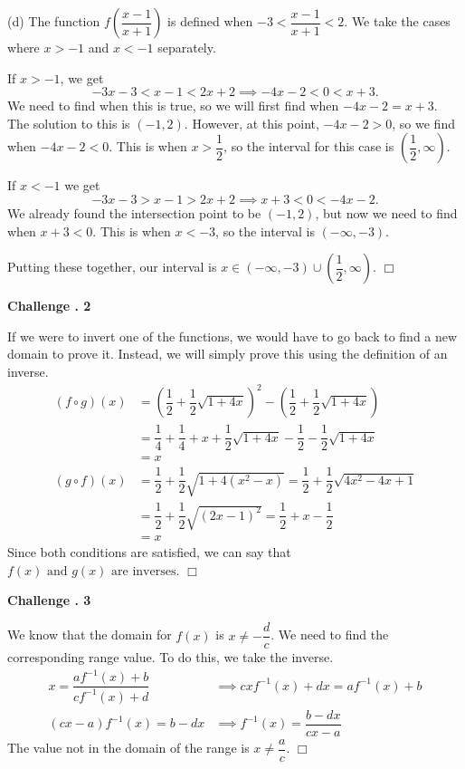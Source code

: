 \documentclass[lang=en,11pt]{elegantbook}
\begin{document}
(d) The function $f\left(\dfrac{x-1}{x+1}\right)$ is defined when $-3<\dfrac{x-1}{x+1}<2$.  We take the cases where $x>-1$ and $x<-1$ separately.

If $x>-1$, we get $$-3x-3<x-1<2x+2 \implies -4x-2<0<x+3.$$  We need to find when this is true, so we will first find when $-4x-2=x+3$.  The solution to this is $(-1,2)$.  However, at this point, $-4x-2>0$, so we find when $-4x-2<0$.  This is when $x> \dfrac{1}{2}$, so the interval for this case is $\left(\dfrac{1}{2},\infty\right)$.

If $x<-1$ we get $$-3x-3>x-1>2x+2 \implies x+3<0<-4x-2.$$  We already found the intersection point to be $(-1,2)$, but now we need to find when $x+3< 0$.  This is when $x<-3$, so the interval is $(-\infty,-3)$.

Putting these together, our interval is $\boxed{x\in(-\infty,-3)\cup\left(\dfrac{1}{2},\infty\right)}$. $\Box$

\noindent \textbf{Challenge . 2}

If we were to invert one of the functions, we would have to go back to find a new domain to prove it.  Instead, we will simply prove this using the definition of an inverse.  \begin{align*}
    (f\circ g)(x)&=\left(\dfrac{1}{2}+\dfrac{1}{2}\sqrt{1+4x}\right)^2-\left(\dfrac{1}{2}+\dfrac{1}{2}\sqrt{1+4x}\right) \\
    &=\dfrac{1}{4}+\dfrac{1}{4}+x+\dfrac{1}{2}\sqrt{1+4x}-\dfrac{1}{2}-\dfrac{1}{2}\sqrt{1+4x} \\&=x \\
    (g\circ f)(x)&=\dfrac{1}{2}+\dfrac{1}{2}\sqrt{1+4\left(x^2-x\right)}=\dfrac{1}{2}+\dfrac{1}{2}\sqrt{4x^2-4x+1} \\
    &=\dfrac{1}{2}+\dfrac{1}{2}\sqrt{\left(2x-1\right)^2}=\dfrac{1}{2}+x-\dfrac{1}{2} \\ &=x
\end{align*}
Since both conditions are satisfied, we can say that $\boxed{f(x)\text{ and } g(x) \text{ are inverses}}$. $\Box$\vspace{3mm}

\noindent \textbf{Challenge . 3}

We know that the domain for $f(x)$ is $x\neq -\dfrac{d}{c}$.  We need to find the corresponding range value.  To do this, we take the inverse.  \begin{align*}
    x=\dfrac{af^{-1}(x)+b}{cf^{-1}(x)+d} &\implies cxf^{-1}(x)+dx=af^{-1}(x)+b \\
    (cx-a)f^{-1}(x)=b-dx &\implies f^{-1}(x)=\dfrac{b-dx}{cx-a}
\end{align*}
The value not in the domain of the range is $\boxed{x\neq \dfrac{a}{c}}$. $\Box$\vspace{3mm}
\end{document}
